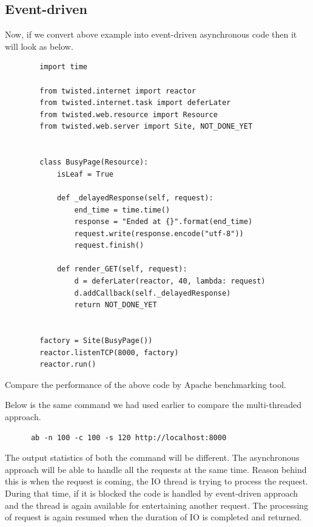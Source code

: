 \documentclass{article}
\begin{document}
    \subsection{Event-driven}
      Now, if we convert above example into event-driven asynchronous code
      then it will look as below.

      \begin{verbatim}
        import time

        from twisted.internet import reactor
        from twisted.internet.task import deferLater
        from twisted.web.resource import Resource
        from twisted.web.server import Site, NOT_DONE_YET


        class BusyPage(Resource):
            isLeaf = True

            def _delayedResponse(self, request):
                end_time = time.time()
                response = "Ended at {}".format(end_time)
                request.write(response.encode("utf-8"))
                request.finish()

            def render_GET(self, request):
                d = deferLater(reactor, 40, lambda: request)
                d.addCallback(self._delayedResponse)
                return NOT_DONE_YET


        factory = Site(BusyPage())
        reactor.listenTCP(8000, factory)
        reactor.run()
      \end{verbatim}

    Compare the performance of the above code by Apache benchmarking tool.

    Below is the same command we had used earlier to compare the multi-threaded
    approach.

    \begin{verbatim}
      ab -n 100 -c 100 -s 120 http://localhost:8000
    \end{verbatim}

    The output statistics of both the command will be different. The
    asynchronous approach will be able to handle all the requests at the same
    time. Reason behind this is when the request is coming, the IO thread is
    trying to process the request. During that time, if it is blocked the code
    is handled by event-driven approach and the thread is again available for
    entertaining another request. The processing of request is again resumed
    when the duration of IO is completed and returned.
\end{document}
